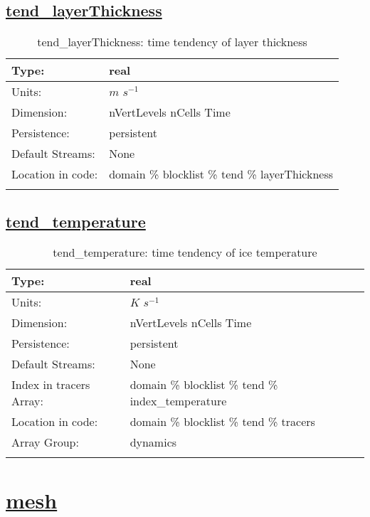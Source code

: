 \subsection[tend\_layerThickness]{\hyperref[sec:var_tab_tend]{tend\_layerThickness}}
\label{subsec:var_sec_tend_tend_layerThickness}
\begin{center}
\begin{longtable}{| p{2.0in} | p{4.0in} |}
        \hline 
        Type: & real \\
        \hline 
        Units: & $m$ $s^{-1}$ \\
        \hline 
        Dimension: & nVertLevels nCells Time \\
        \hline 
        Persistence: & persistent \\
        \hline 
		 Default Streams: & None \\
        \hline 
		 Location in code: & domain \% blocklist \% tend \% layerThickness \\
		 \hline 
    \caption{tend\_layerThickness: time tendency of layer thickness}
\end{longtable}
\end{center}
\subsection[tend\_temperature]{\hyperref[sec:var_tab_tend]{tend\_temperature}}
\label{subsec:var_sec_tend_tend_temperature}
\begin{center}
\begin{longtable}{| p{2.0in} | p{4.0in} |}
        \hline 
        Type: & real \\
        \hline 
        Units: & $K$ $s^{-1}$ \\
        \hline 
        Dimension: & nVertLevels nCells Time \\
        \hline 
        Persistence: & persistent \\
        \hline 
		 Default Streams: & None \\
        \hline 
		 Index in tracers Array: & domain \% blocklist \% tend \% index\_temperature \\
		 \hline 
		 Location in code: & domain \% blocklist \% tend \% tracers \\
		 \hline 
		 Array Group: & dynamics \\
		 \hline 
    \caption{tend\_temperature: time tendency of ice temperature}
\end{longtable}
\end{center}
\section[mesh]{\hyperref[sec:var_tab_mesh]{mesh}}
\label{sec:var_sec_mesh}
